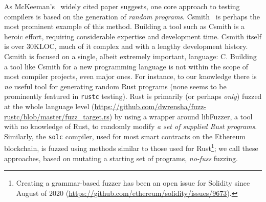 As McKeeman's~\cite{Differential} widely cited paper suggests, one core approach to testing compilers is
based on
the generation of \emph{random programs}.  Csmith~\cite{csmith} is perhaps the most prominent
example of this method.  Building a tool such as Csmith
is a heroic effort, requiring considerable expertise and
development time.  Csmith itself is over 30KLOC, much of it complex
and with a lengthy development history.  Csmith is focused on a
single, albeit extremely important, language: C.  Building a tool like
Csmith for a new programming language is not within the scope of most
compiler projects, even major ones.  For instance, to our knowledge
there is \emph{no} useful tool for generating random Rust programs
(none seems to be
prominently featured in {\tt rustc} testing).  Rust
is primarily (or perhaps \emph{only}) fuzzed at the whole language
level
(\url{https://github.com/dwrensha/fuzz-rustc/blob/master/fuzz_target.rs}) by
using a wrapper around libFuzzer, a tool with no knowledge of Rust, to randomly modify \emph{a set of supplied Rust
programs}.  Similarly, the {\tt solc} compiler, used for most smart contracts on
the Ethereum blockchain, is fuzzed using methods similar to those used for
Rust\footnote{Creating a
grammar-based fuzzer has been an open issue for Solidity since August
of 2020 (\url{https://github.com/ethereum/solidity/issues/9673}).}; we
call these approaches, based on mutating a starting set of
programs, \emph{no-fuss} fuzzing.  

